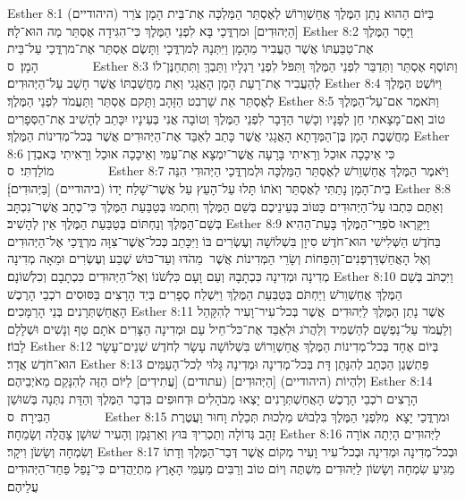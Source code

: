 Esther 8:1	בַּיּוֹם הַהוּא נָתַן הַמֶּלֶךְ אֲחַשְׁוֵרוֹשׁ לְאֶסְתֵּר הַמַּלְכָּה אֶת־בֵּית הָמָן צֹרֵר (היהודיים) [הַיְּהוּדִים] וּמרְדֳּכַי בָּא לִפְנֵי הַמֶּלֶךְ כִּי־הִגִּידָה אֶסְתֵּר מַה הוּא־לָהּ׃
Esther 8:2	וַיָּסַר הַמֶּלֶךְ אֶת־טַבַּעְתּוֹ אֲשֶׁר הֶעֱבִיר מֵהָמָן וַיִּתְּנָהּ לְמרְדֳּכָי וַתָּשֶׂם אֶסְתֵּר אֶת־מרְדֳּכַי עַל־בֵּית הָמָן׃ {ס}        
Esther 8:3	וַתּוֹסֶף אֶסְתֵּר וַתְּדַבֵּר לִפְנֵי הַמֶּלֶךְ וַתִּפֹּל לִפְנֵי רַגְלָיו וַתֵּבְךְּ וַתִּתְחַנֶּן־לוֹ לְהַעֲבִיר אֶת־רָעַת הָמָן הָאֲגָגִי וְאֵת מַחֲשַׁבְתּוֹ אֲשֶׁר חָשַׁב עַל־הַיְּהוּדִים׃
Esther 8:4	וַיּוֹשֶׁט הַמֶּלֶךְ לְאֶסְתֵּר אֵת שַׁרְבִט הַזָּהָב וַתָּקם אֶסְתֵּר וַתַּעֲמֹד לִפְנֵי הַמֶּלֶךְ׃
Esther 8:5	וַתֹּאמֶר אִם־עַל־הַמֶּלֶךְ טוֹב וְאִם־מָצָאתִי חֵן לְפָנָיו וְכָשֵׁר הַדָּבָר לִפְנֵי הַמֶּלֶךְ וְטוֹבָה אֲנִי בְּעֵינָיו יִכָּתֵב לְהָשִׁיב אֶת־הַסְּפָרִים מַחֲשֶׁבֶת הָמָן בֶּן־הַמְּדָתָא הָאֲגָגִי אֲשֶׁר כָּתַב לְאַבֵּד אֶת־הַיְּהוּדִים אֲשֶׁר בְּכל־מְדִינוֹת הַמֶּלֶךְ׃
Esther 8:6	כִּי אֵיכָכָה אוּכַל וְרָאִיתִי בָּרָעָה אֲשֶׁר־יִמְצָא אֶת־עַמִּי וְאֵיכָכָה אוּכַל וְרָאִיתִי בְּאבְדַן מוֹלַדְתִּי׃ {ס}        
Esther 8:7	וַיֹּאמֶר הַמֶּלֶךְ אֲחַשְׁוֵרֹשׁ לְאֶסְתֵּר הַמַּלְכָּה וּלְמרְדֳּכַי הַיְּהוּדִי הִנֵּה בֵית־הָמָן נָתַתִּי לְאֶסְתֵּר וְאֹתוֹ תָּלוּ עַל־הָעֵץ עַל אֲשֶׁר־שָׁלַח יָדוֹ (ביהודיים) [בַּיְּהוּדִים]׃
Esther 8:8	וְאַתֶּם כִּתְבוּ עַל־הַיְּהוּדִים כַּטּוֹב בְּעֵינֵיכֶם בְּשֵׁם הַמֶּלֶךְ וְחִתְמוּ בְּטַבַּעַת הַמֶּלֶךְ כִּי־כְתָב אֲשֶׁר־נִכְתָּב בְּשֵׁם־הַמֶּלֶךְ וְנַחְתּוֹם בְּטַבַּעַת הַמֶּלֶךְ אֵין לְהָשִׁיב׃
Esther 8:9	וַיִּקָּרְאוּ סֹפְרֵי־הַמֶּלֶךְ בָּעֵת־הַהִיא בַּחֹדֶשׁ הַשְּׁלִישִׁי הוּא־חֹדֶשׁ סִיוָן בִּשְׁלוֹשָׁה וְעֶשְׂרִים בּוֹ וַיִּכָּתֵב כְּכל־אֲשֶׁר־צִוָּה מרְדֳּכַי אֶל־הַיְּהוּדִים וְאֶל הָאֲחַשְׁדַּרְפְּנִים־וְהַפַּחוֹת וְשָׂרֵי הַמְּדִינוֹת אֲשֶׁר  מֵהֹדּוּ וְעַד־כּוּשׁ שֶׁבַע וְעֶשְׂרִים וּמֵאָה מְדִינָה מְדִינָה וּמְדִינָה כִּכְתָבָהּ וְעַם וָעָם כִּלְשֹׁנוֹ וְאֶל־הַיְּהוּדִים כִּכְתָבָם וְכִלְשׁוֹנָם׃
Esther 8:10	וַיִּכְתֹּב בְּשֵׁם הַמֶּלֶךְ אֲחַשְׁוֵרֹשׁ וַיַּחְתֹּם בְּטַבַּעַת הַמֶּלֶךְ וַיִּשְׁלַח סְפָרִים בְּיַד הָרָצִים בַּסּוּסִים רֹכְבֵי הָרֶכֶשׁ הָאֲחַשְׁתְּרָנִים בְּנֵי הָרַמָּכִים׃
Esther 8:11	אֲשֶׁר נָתַן הַמֶּלֶךְ לַיְּהוּדִים  אֲשֶׁר בְּכל־עִיר־וָעִיר לְהִקָּהֵל וְלַעֲמֹד עַל־נַפְשָׁם לְהַשְׁמִיד וְלַהֲרֹג וּלְאַבֵּד אֶת־כּל־חֵיל עַם וּמְדִינָה הַצָּרִים אֹתָם טַף וְנָשִׁים וּשְׁלָלָם לָבוֹז׃
Esther 8:12	בְּיוֹם אֶחָד בְּכל־מְדִינוֹת הַמֶּלֶךְ אֲחַשְׁוֵרוֹשׁ בִּשְׁלוֹשָׁה עָשָׂר לְחֹדֶשׁ שְׁנֵים־עָשָׂר הוּא־חֹדֶשׁ אֲדָר׃
Esther 8:13	פַּתְשֶׁגֶן הַכְּתָב לְהִנָּתֵן דָּת בְּכל־מְדִינָה וּמְדִינָה גָּלוּי לְכל־הָעַמִּים וְלִהְיוֹת (היהודיים) [הַיְּהוּדִים] (עתודים) [עֲתִידִים] לַיּוֹם הַזֶּה לְהִנָּקֵם מֵאֹיְבֵיהֶם׃
Esther 8:14	הָרָצִים רֹכְבֵי הָרֶכֶשׁ הָאֲחַשְׁתְּרָנִים יָצְאוּ מְבֹהָלִים וּדְחוּפִים בִּדְבַר הַמֶּלֶךְ וְהַדָּת נִתְּנָה בְּשׁוּשַׁן הַבִּירָה׃ {ס}        
Esther 8:15	וּמרְדֳּכַי יָצָא  מִלִּפְנֵי הַמֶּלֶךְ בִּלְבוּשׁ מַלְכוּת תְּכֵלֶת וָחוּר וַעֲטֶרֶת זָהָב גְּדוֹלָה וְתַכְרִיךְ בּוּץ וְאַרְגָּמָן וְהָעִיר שׁוּשָׁן צָהֲלָה וְשָׂמֵחָה׃
Esther 8:16	לַיְּהוּדִים הָיְתָה אוֹרָה וְשִׂמְחָה וְשָׂשֹׂן וִיקָר׃
Esther 8:17	וּבְכל־מְדִינָה וּמְדִינָה וּבְכל־עִיר וָעִיר מְקוֹם אֲשֶׁר דְּבַר־הַמֶּלֶךְ וְדָתוֹ מַגִּיעַ שִׂמְחָה וְשָׂשׂוֹן לַיְּהוּדִים מִשְׁתֶּה וְיוֹם טוֹב וְרַבִּים מֵעַמֵּי הָאָרֶץ מִתְיַהֲדִים כִּי־נָפַל פַּחַד־הַיְּהוּדִים עֲלֵיהֶם׃
